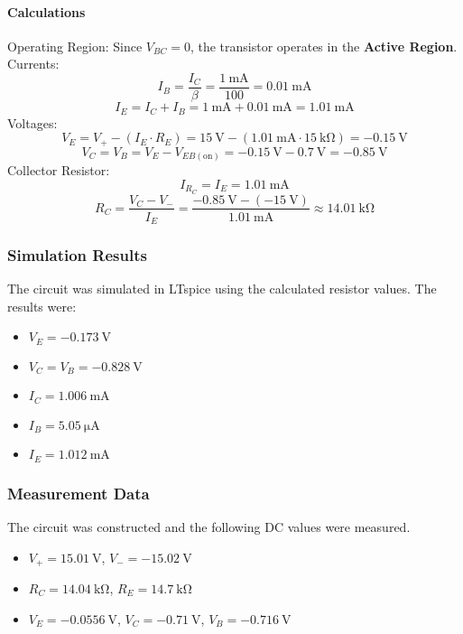 \documentclass[12pt]{article}
\begin{document}
\paragraph{Calculations}
Operating Region: Since $V_{BC}=0$, the transistor operates in the \textbf{Active Region}.
Currents:
$$
I_B = \frac{I_C}{\beta} = \frac{\SI{1}{\milli\ampere}}{100} = \SI{0.01}{\milli\ampere}
$$
$$
I_E = I_C + I_B = \SI{1}{\milli\ampere} + \SI{0.01}{\milli\ampere} = \SI{1.01}{\milli\ampere}
$$
Voltages:
$$
V_E = V_{+} - (I_E \cdot R_E) = \SI{15}{\volt} - (\SI{1.01}{\milli\ampere} \cdot \SI{15}{\kilo\ohm}) = \SI{-0.15}{\volt}
$$
$$
V_C = V_B = V_E - V_{EB(\text{on})} = \SI{-0.15}{\volt} - \SI{0.7}{\volt} = \SI{-0.85}{\volt}
$$
Collector Resistor:
$$
I_{R_C} = I_E = \SI{1.01}{\milli\ampere}
$$
$$
R_C = \frac{V_C - V_{-}}{I_E} = \frac{\SI{-0.85}{\volt} - (\SI{-15}{\volt})}{\SI{1.01}{\milli\ampere}} \approx \SI{14.01}{\kilo\ohm}
$$

\subsubsection{Simulation Results}
The circuit was simulated in LTspice using the calculated resistor values. The results were:
\begin{itemize}
    \item $V_E = \SI{-0.173}{\volt}$
    \item $V_C = V_B = \SI{-0.828}{\volt}$
    \item $I_C = \SI{1.006}{\milli\ampere}$
    \item $I_B = \SI{5.05}{\micro\ampere}$
    \item $I_E = \SI{1.012}{\milli\ampere}$
\end{itemize}

\subsubsection{Measurement Data}
The circuit was constructed and the following DC values were measured.
\begin{itemize}
    \item $V_+ = \SI{15.01}{\volt}$, $V_- = \SI{-15.02}{\volt}$
    \item $R_C = \SI{14.04}{\kilo\ohm}$, $R_E = \SI{14.7}{\kilo\ohm}$
    \item $V_E = \SI{-0.0556}{\volt}$, $V_C = \SI{-0.71}{\volt}$, $V_B = \SI{-0.716}{\volt}$
\end{itemize}
\end{document}
